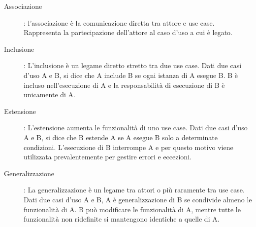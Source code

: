 \documentclass[../norme-di-progetto.tex]{subfiles}
\begin{document}
\begin{description}
	\item [Associazione]: l'associazione è la comunicazione diretta tra attore e use case. Rappresenta la partecipazione dell'attore al caso d'uso a cui è legato.
	\item [Inclusione]: L'inclusione è un legame diretto stretto tra due use case. Dati due casi d'uso A e B, si dice che A include B se ogni istanza di A esegue B. B è incluso nell'esecuzione di A e la responsabilità di esecuzione di B è unicamente di A.
	\item [Estensione]: L'estensione aumenta le funzionalità di uno use case. Dati due casi d'uso A e B, si dice che B estende A se A esegue B solo a determinate condizioni. L'esecuzione di B interrompe A e per questo motivo viene utilizzata prevalentemente per gestire errori e eccezioni.
	\item [Generalizzazione]: La generalizzazione è un legame tra attori o più raramente tra use case. Dati due casi d'uso A e B, A è generalizzazione di B se condivide almeno le funzionalità di A. B può modificare le funzionalità di A, mentre tutte le funzionalità non ridefinite si mantengono identiche a quelle di A.
\end{description}
\end{document}
